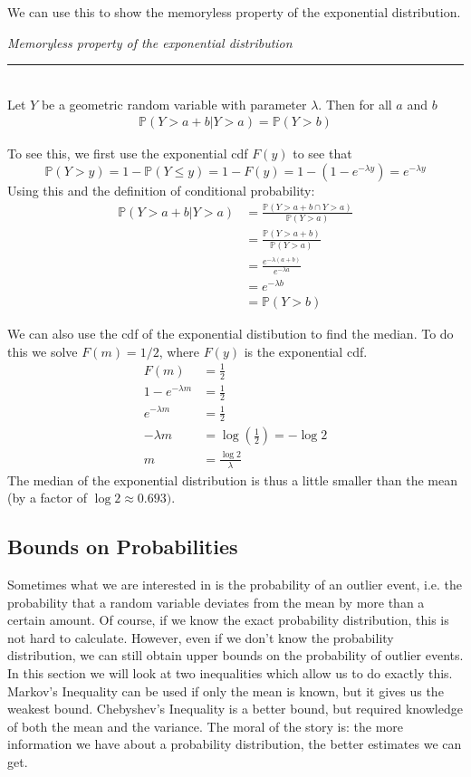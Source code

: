 \documentclass[12pt]{article}
\theoremstyle{definition}
\theoremstyle{remark}
\def\P{{\mathbb P}}
\begin{document}
We can use this to show the memoryless property of the exponential distribution.

\begin{framed}
\emph{Memoryless property of the exponential distribution}\\
  \rule{\dimexpr{}\fboxrule}{.1pt} \\
Let $Y$ be a geometric random variable with parameter $\lambda$. Then for all $a$ and $b$
\begin{align*}
\P(Y > a + b | Y > a) = \P(Y > b)
\end{align*}
\end{framed}
To see this, we first use the exponential cdf $F(y)$ to see that
\[
\P(Y > y) = 1 - \P(Y \leq y) = 1 - F(y) = 1 - (1 - e^{-\lambda y}) = e^{-\lambda y}
\]
Using this and the definition of conditional probability:
\begin{align*}
\P(Y > a + b | Y > a) &= \frac{ \P(Y > a + b \cap Y > a) }{ \P(Y > a )} \\
&= \frac{ \P(Y > a + b ) }{ \P(Y > a )} \\
&= \frac{e^{-\lambda(a+b)}}{e^{-\lambda a}} \\
&= e^{-\lambda b} \\
&= \P(Y > b)
\end{align*}

We can also use the cdf of the exponential distibution to find the median. To do this we solve $F(m) = 1/2$, where $F(y)$ is the exponential cdf.
\begin{align*}
F(m) &= \frac{1}{2} \\
1 - e^{-\lambda m} &= \frac{1}{2} \\
e^{-\lambda m} &= \frac{1}{2} \\
- \lambda m &= \log\left( \frac{1}{2} \right) = -\log 2 \\
m &= \frac{\log 2}{\lambda}
\end{align*} 
The median of the exponential distribution is thus a little smaller than the mean (by a factor of $\log 2 \approx 0.693)$.

\subsection{Bounds on Probabilities}
Sometimes what we are interested in is the probability of an outlier event, i.e. the probability that a random variable deviates from the mean by more than a certain amount. Of course, if we know the exact probability distribution, this is not hard to calculate. However, even if we don't know the probability distribution, we can still obtain upper bounds on the probability of outlier events. In this section we will look at two inequalities which allow us to do exactly this. Markov's Inequality can be used if only the mean is known, but it gives us the weakest bound. Chebyshev's Inequality is a better bound, but required knowledge of both the mean and the variance. The moral of the story is: the more information we have about a probability distribution, the better estimates we can get.
\end{document}
